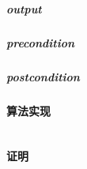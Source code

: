\documentclass[a4paper]{book}
\numberwithin{equation}{chapter}
\theoremstyle{definition}
\begin{document}
\begin{multicols}{2}
\subparagraph{output}

\subparagraph{precondition}

\subparagraph{postcondition}

\paragraph{算法实现}
\begin{lstlisting}

\end{lstlisting}
\paragraph{证明}




\end{multicols}
\end{document}
